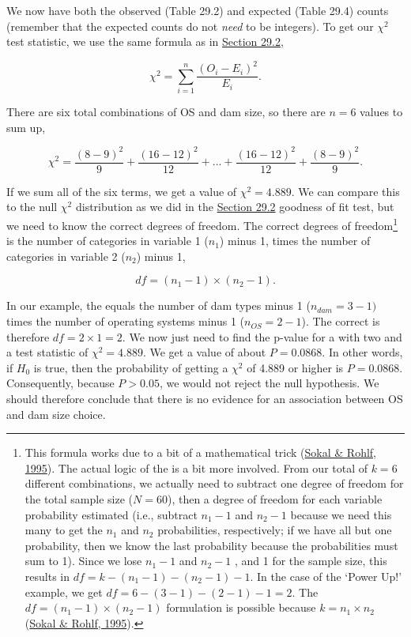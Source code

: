 \documentclass[
  openany]{krantz}
\begin{document}
We now have both the observed (Table 29.2) and expected (Table 29.4) counts (remember that the expected counts do not \emph{need} to be integers).
To get our \(\chi^{2}\) test statistic, we use the same formula as in \protect\hyperlink{chi-squared-goodness-of-fit}{Section 29.2},

\[\chi^{2} = \sum_{i = 1}^{n} \frac{\left(O_{i} - E_{i}\right)^{2}}{E_{i}}.\]

There are six total combinations of OS and dam size, so there are \(n = 6\) values to sum up,

\[\chi^{2} = \frac{(8-9)^2}{9} + \frac{(16 - 12)^{2}}{12} + ... + \frac{(16 - 12)^{2}}{12} + \frac{(8-9)^2}{9}.\]

If we sum all of the six terms, we get a value of \(\chi^{2} = 4.889\).
We can compare this to the null \(\chi^{2}\) distribution as we did in the \protect\hyperlink{chi-squared-goodness-of-fit}{Section 29.2} goodness of fit test, but we need to know the correct degrees of freedom.
The correct degrees of freedom\footnote{This formula works due to a bit of a mathematical trick (\protect\hyperlink{ref-Sokal1995}{Sokal \& Rohlf, 1995}). The actual logic of the  is a bit more involved. From our total of \(k = 6\) different combinations, we actually need to subtract one degree of freedom for the total sample size (\(N = 60\)), then a degree of freedom for each variable probability estimated (i.e., subtract \(n_{1} - 1\) and \(n_{2} - 1\) because we need this many  to get the \(n_{1}\) and \(n_{2}\) probabilities, respectively; if we have all but one probability, then we know the last probability because the probabilities must sum to 1). Since we lose \(n_{1} - 1\) and \(n_{2} - 1\) , and 1 for the sample size, this results in \(df = k - (n_{1} - 1) - (n_{2} - 1) - 1\). In the case of the `Power Up!' example, we get \(df = 6 - (3 - 1) - (2 - 1) - 1 = 2\). The \(df = (n_{1} - 1) \times (n_{2} - 1)\) formulation is possible because \(k = n_{1} \times n_{2}\) (\protect\hyperlink{ref-Sokal1995}{Sokal \& Rohlf, 1995}).} is the number of categories in variable 1 (\(n_{1}\)) minus 1, times the number of categories in variable 2 (\(n_{2}\)) minus 1,

\[df = (n_{1} - 1) \times (n_{2} - 1).\]

In our example, the  equals the number of dam types minus 1 (\(n_{dam} = 3 - 1)\) times the number of operating systems minus 1 (\(n_{OS} = 2 - 1\)).
The correct  is therefore \(df = 2 \times 1 = 2\).
We now just need to find the p-value for a  with two  and a test statistic of \(\chi^{2} = 4.889\).
We get a value of about \(P = 0.0868\).
In other words, if \(H_{0}\) is true, then the probability of getting a \(\chi^{2}\) of 4.889 or higher is \(P = 0.0868\).
Consequently, because \(P > 0.05\), we would not reject the null hypothesis.
We should therefore conclude that there is no evidence for an association between OS and dam size choice.
\end{document}
